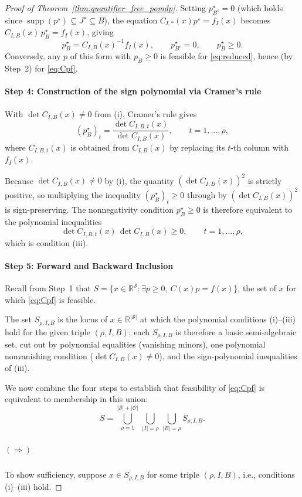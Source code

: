 \documentclass{article}
\theoremstyle{definition}
\theoremstyle{remark}
\newcommand{\supp}{\operatorname{supp}}
\begin{document}
\begin{proof}[Proof of Theorem~\ref{thm:quantifier_free_pomdp}]
Setting $p^\star_{B^c}=0$ (which holds since $\supp(p^\star)\subseteq J^\star\subseteq B$), the equation $C_{I,*}(x)p^\star=f_I(x)$ becomes $C_{I,B}(x)\,p^\star_B=f_I(x)$, giving
\[
p^\star_B = C_{I,B}(x)^{-1}f_I(x),\qquad p^\star_{B^c}=0,\qquad p^\star_B\ge 0.
\]
Conversely, any $p$ of this form with $p_B\ge 0$ is feasible for \eqref{eq:reduced}, hence (by Step~2) for \eqref{eq:Cpf}.

\paragraph{Step 4: Construction of the sign polynomial via Cramer's rule}
With $\det C_{I,B}(x)\ne 0$ from (i), Cramer's rule gives
\[
(p_B^\star)_t = \frac{\det C_{I,B,t}(x)}{\det C_{I,B}(x)}, \qquad t=1,\dots,\rho,
\]
where $C_{I,B,t}(x)$ is obtained from $C_{I,B}(x)$ by replacing its $t$-th column with $f_I(x)$. 

Because $\det C_{I,B}(x)\ne 0$ by (i), the quantity $(\det C_{I,B}(x))^2$ is strictly positive, so multiplying the inequality $(p_B^\star)_t\ge 0$ through by $(\det C_{I,B}(x))^2$ is sign-preserving. The nonnegativity condition $p_B^\star\ge 0$ is therefore equivalent to the polynomial inequalities
\[
\det C_{I,B,t}(x)\,\det C_{I,B}(x) \ge 0, \qquad t=1,\dots,\rho,
\]
which is condition (iii).

\paragraph{Step 5: Forward and Backward Inclusion} Recall from Step~1 that $S=\{x\in\mathbb R^{\mathcal S}:\exists p\ge 0,\ C(x)p=f(x)\}$, the set of $x$ for which \eqref{eq:Cpf} is feasible. 

The set $S_{\rho,I,B}$ is the locus of $x\in\mathbb R^{|\mathcal S|}$ at which the polynomial conditions (i)--(iii) hold for the given triple $(\rho,I,B)$; each $S_{\rho,I,B}$ is therefore a basic semi-algebraic set, cut out by polynomial equalities (vanishing minors), one polynomial nonvanishing condition ($\det C_{I,B}(x)\ne 0$), and the sign-polynomial inequalities of (iii).

We now combine the four steps to establish that feasibility of \eqref{eq:Cpf} is equivalent to membership in this union:
\[
S = \bigcup_{\rho=1}^{|\mathcal S|+|\mathcal O|}\,\bigcup_{|I|=\rho}\,\bigcup_{|B|=\rho} S_{\rho,I,B}.
\]

\subparagraph{$\left(\Rightarrow \right)$} To show sufficiency, suppose $x\in S_{\rho,I,B}$ for some triple $(\rho,I,B)$, i.e., conditions (i)--(iii) hold.


\end{proof}
\end{document}
